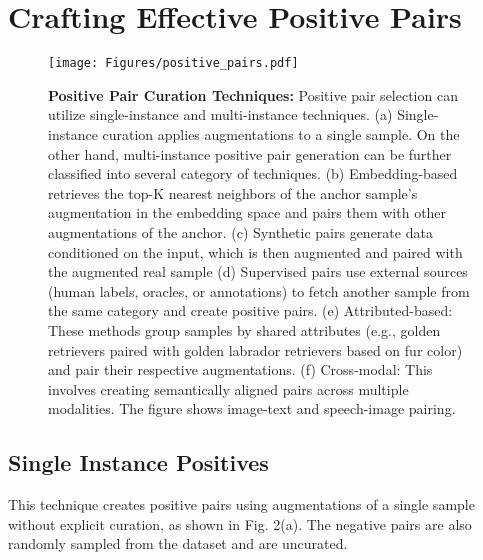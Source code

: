 \section{Crafting Effective Positive Pairs
}
\label{sec: Positive_Pair}

\begin{figure*}[h!]
    \centering
    \texttt{[image: Figures/positive\_pairs.pdf]}
    \caption{\textbf{Positive Pair Curation Techniques: } Positive pair selection can utilize single-instance and multi-instance techniques. (a) Single-instance curation applies augmentations to a single sample. On the other hand, multi-instance positive pair generation can be further classified into several category of techniques. (b) Embedding-based retrieves the top-K nearest neighbors of the anchor sample's augmentation in the embedding space and pairs them with other augmentations of the anchor. (c) Synthetic pairs generate data conditioned on the input, which is then augmented and paired with the augmented real sample (d) Supervised pairs use external sources (human labels, oracles, or annotations) to fetch another sample from the same category and create positive pairs. (e) Attributed-based: These methods group samples by shared attributes (e.g., golden retrievers paired with golden labrador retrievers based on fur color) and pair their respective augmentations. (f) Cross-modal: This involves creating semantically aligned pairs across multiple modalities. The figure shows image-text and speech-image pairing.}
    \label{fig:positive}
\end{figure*}

\subsection{Single Instance Positives}

This technique creates positive pairs using augmentations of a single sample without explicit curation, as shown in Fig. 2(a).  The negative pairs are also randomly sampled from the dataset and are uncurated. %

